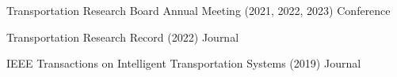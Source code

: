 

\begin{cvservices}

  \cvservice
    {Transportation Research Board Annual Meeting} %
    {(2021, 2022, 2023)} %
    {} %
    {Conference} %

  \cvservice
    {Transportation Research Record} %
    {(2022)} %
    {} %
    {Journal} %

  \cvservice
    {IEEE Transactions on Intelligent Transportation Systems} %
    {(2019)} %
    {} %
    {Journal} %

\end{cvservices}

